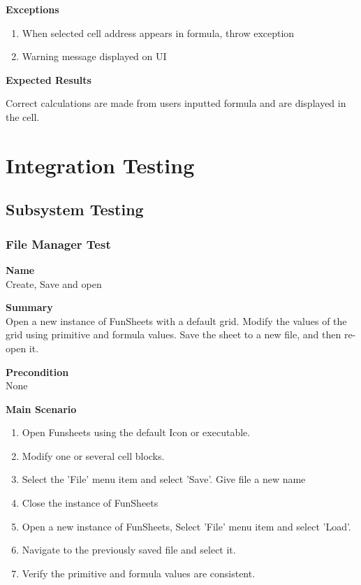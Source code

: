 \documentclass[12pt]{article}
\begin{document}
\noindent
{\bf Exceptions}
\begin{enumerate}
	\item When selected cell address appears in formula, throw exception 
	\item Warning message displayed on UI
\end{enumerate}

\noindent
{\bf Expected Results}

Correct calculations are made from users inputted formula and are displayed in the cell. 

\section{Integration Testing}

\subsection{Subsystem Testing}

\subsubsection{File Manager Test} \label{uc:1}

\noindent
{\bf Name}\\
Create, Save and open

\noindent
{\bf Summary}\\
Open a new instance of FunSheets with a default grid. Modify the values of the grid using primitive and formula values.
Save the sheet to a new file, and then re-open it.

\noindent
{\bf Precondition}\\
None

\noindent
{\bf Main Scenario}\
\vspace*{-0.2in}
\begin{enumerate}
\item Open Funsheets using the default Icon or executable.
\item Modify one or several cell blocks.
\item Select the 'File' menu item and select 'Save'. Give file a new name
\item Close the instance of FunSheets
\item Open a new instance of FunSheets, Select 'File' menu item and select 'Load'.
\item Navigate to the previously saved file and select it.
\item Verify the primitive and formula values are consistent.
\end{enumerate}
\end{document}
